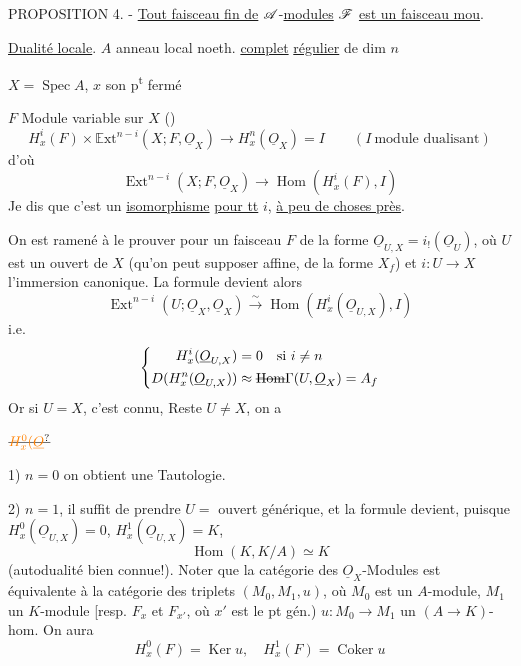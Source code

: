 PROPOSITION 4. - \uline{Tout faisceau fin de} $\mathscr A$-\uline{modules} $\mathscr F$ \uline{est un faisceau mou}.

\uline{Dualité locale}. \quad $A$ anneau local noeth. \uline{complet} \uline{régulier} de dim $n$

$X=\operatorname{Spec} A$, $x$ son p\textsuperscript{t} fermé

$F$ Module variable sur $X$ ()
\[
 H_x^i(F)\times\mathbb E\mathrm{xt}^{n-i}(X;F,\underline O_X)\longrightarrow H_x^n(\underline O_X)=I
 \qquad(I\ \text{module dualisant})
\]
d'où
\[
 \boxed{\operatorname{Ext}^{n-i}(X;F,\underline O_X)\longrightarrow\operatorname{Hom}(H_x^i(F),I)}
\]
Je dis que c'est un \uline{isomorphisme} \uline{pour tt} $i$, \uline{à peu de choses près}.

On est ramené à le prouver pour un faisceau $F$ de la forme $\underline O_{U,X}=i_!(\underline O_U)$, où $U$ est un ouvert de $X$ (qu'on peut supposer affine, de la forme $X_f$) et $i:U\longrightarrow X$ l'immersion canonique. La formule devient alors
\[
 \operatorname{Ext}^{n-i}(U;\underline O_{X},\underline O_X)\xrightarrow{\sim}\operatorname{Hom}(H_x^i(\underline O_{U,X}),I)
\]
i.e.
\[
 \left\{\begin{aligned}
 H_x^i(\underline O_{U,X})&=0\quad\text{si }i\ne n\\
 D(H_x^n(\underline O_{U,X}))&\approx\deleted{\operatorname{Hom}}\Gamma(U,\underline O_X)=A_f
 \end{aligned}\right.
\]
 Or  si $U=X$, c'est connu, Reste $U\ne X$, on a

$\deleted{\unsure{H^0_x(\underline O}}$

1) $n=0$ on obtient une Tautologie.

2) $n=1$, il suffit de prendre $U=$ ouvert générique, et la formule devient, puisque $H^0_x(\underline O_{U,X})=0$, $H^1_x(\underline O_{U,X})=K$,
\[
 \operatorname{Hom}(K,K/A)\simeq K
\]
(autodualité bien connue!). Noter que  la catégorie des $\underline O_X$-Modules est équivalente à la catégorie des triplets $(M_0,M_1,u)$, où $M_0$ est un $A$-module, $M_1$ un $K$-module [resp. $F_x$ et $F_{x'}$, où $x'$ est le pt gén.)  $u:M_0\longrightarrow M_1$ un $(A\longrightarrow K)$-hom. On aura
\[
 H_x^0(F)=\operatorname{Ker}u,\quad H_x^1(F)=\operatorname{Coker}u
\]

